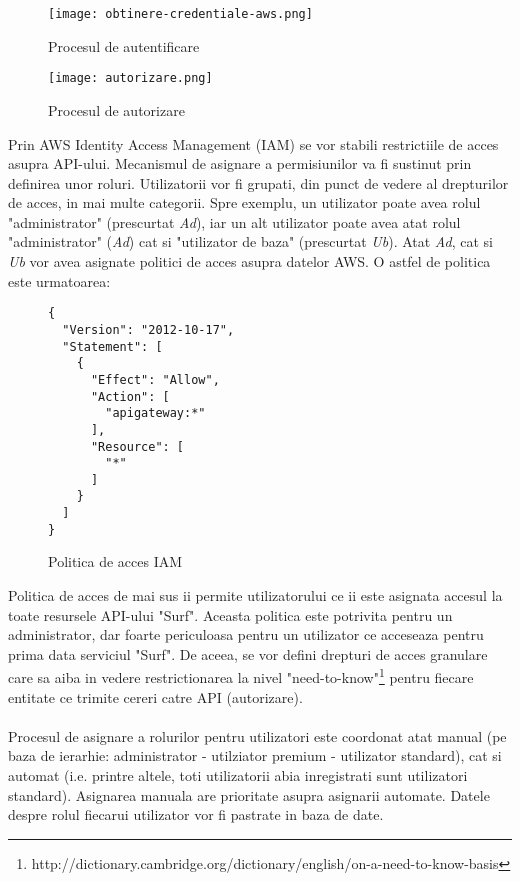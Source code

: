 \begin{figure}[ht]
\begin{center}
	\texttt{[image: obtinere-credentiale-aws.png]}
	\caption{Procesul de autentificare \cite{diagram-icons-sources}}\par\medskip
	\vspace{10mm}
	\texttt{[image: autorizare.png]}
	\caption{Procesul de autorizare \cite{diagram-icons-sources}}\par\medskip

\end{center}
\end{figure}

\noindent
Prin AWS Identity Access Management (IAM) se vor stabili restrictiile de acces asupra API-ului. Mecanismul de asignare a permisiunilor va fi sustinut prin definirea unor roluri. Utilizatorii vor fi grupati, din punct de vedere al drepturilor de acces, in mai multe categorii. Spre exemplu, un utilizator poate avea rolul "administrator" (prescurtat \emph{Ad}), iar un alt utilizator poate avea atat rolul "administrator" (\emph{Ad}) cat si "utilizator de baza" (prescurtat \emph{Ub}). Atat \emph{Ad}, cat si \emph{Ub} vor avea asignate politici de acces asupra datelor AWS. O astfel de politica este urmatoarea:
\newpage

\begin{figure}[ht]
\begin{verbatim}
{
  "Version": "2012-10-17",
  "Statement": [
    {
      "Effect": "Allow",
      "Action": [
        "apigateway:*"
      ],
      "Resource": [
        "*"
      ]
    }
  ]
}
\end{verbatim}
\begin{center}
	\caption{Politica de acces IAM}\par\medskip
\end{center}
\end{figure}

\noindent
Politica de acces de mai sus ii permite utilizatorului ce ii este asignata accesul la toate resursele API-ului "Surf". Aceasta politica este potrivita pentru un administrator, dar foarte periculoasa pentru un utilizator ce acceseaza pentru prima data serviciul "Surf". De aceea, se vor defini drepturi de acces granulare care sa aiba in vedere restrictionarea la nivel "need-to-know"\footnote{http://dictionary.cambridge.org/dictionary/english/on-a-need-to-know-basis} pentru fiecare entitate ce trimite cereri catre API (autorizare).
\\
\\
Procesul de asignare a rolurilor pentru utilizatori este coordonat atat manual (pe baza de ierarhie: administrator - utilziator premium - utilizator standard), cat si automat (i.e. printre altele, toti utilizatorii abia inregistrati sunt utilizatori standard). Asignarea manuala are prioritate asupra asignarii automate. Datele despre rolul fiecarui utilizator vor fi pastrate in baza de date.
\\

